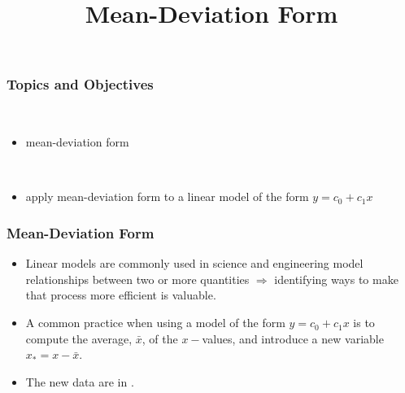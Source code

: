 \title{Mean-Deviation Form}
\subtitle{\SubTitleName}
\institute[]{\Course}
\author{\Instructor}
\maketitle   


\begin{frame}\frametitle{Topics and Objectives}
     \\
    \begin{itemize}
    
        \item mean-deviation form
        
    \end{itemize}
    
    \vspace{0.5cm}
    
    \\
    
    \begin{itemize}
    
        \item apply mean-deviation form to a linear model of the form $y = c_0 + c_1 x$
      
    \end{itemize}
    
    \vspace{0.25cm} 
 
\end{frame}
 
 
 

\begin{frame}
\frametitle{Mean-Deviation Form}

    \begin{itemize}
        \item <1-> Linear models are commonly used in science and engineering model relationships between two or more quantities $\Rightarrow$ identifying ways to make that process more efficient is valuable.
        \item <2-> A common practice when using a model of the form $y = c_0 + c_1x$ is to compute the average, $\bar x$, of the $x-$values, and introduce a new variable $x_{\ast} = x - \bar x$. 
        \item <3-> The new data are in .  
    \end{itemize}
    
\end{frame}

